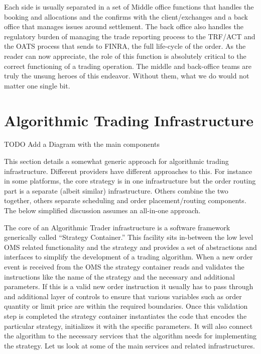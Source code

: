 Each side is usually separated in a set of Middle office functions that handles the booking and allocations and the confirms with the client/exchanges and a back office that manages issues around settlement. The back office also handles the regulatory burden of  managing the trade reporting process to the TRF/ACT and the OATS process that sends to FINRA, the full life-cycle of the order. As the reader can now appreciate, the role of this function is absolutely critical to the correct functioning of a trading operation. The middle and back-office teams are truly the unsung heroes of this endeavor. Without them, what we do would not matter one single bit.



\section{Algorithmic Trading Infrastructure}


TODO Add a Diagram with the main components


This section details a somewhat generic approach for algorithmic trading infrastructure. Different providers have different approaches to this. For instance in some platforms, the core strategy is in one infrastructure but the order routing part is a separate (albeit similar) infrastructure. Others combine the two together, others separate scheduling and order placement/routing components. The below simplified discussion assumes an all-in-one approach.


The core of an Algorithmic Trader infrastructure is a software framework generically called ``Strategy Container.'' This facility sits in-between the low level OMS related functionality and the strategy and provides a set of abstractions and interfaces to simplify the development of a trading algorithm. When a new order event is received from the OMS the strategy container reads and validates the instructions like the name of the strategy and the necessary and additional parameters. If this is a valid new order instruction it usually has to pass through and additional layer of controls to ensure that various variables such as order quantity or limit price are within the required boundaries. Once this validation step is completed the strategy container instantiates the code that encodes the particular strategy, initializes it with the specific parameters. It will also connect the algorithm to the necessary services that the algorithm needs for implementing the strategy. Let us look at some of the main services and related infrastructures. \\


